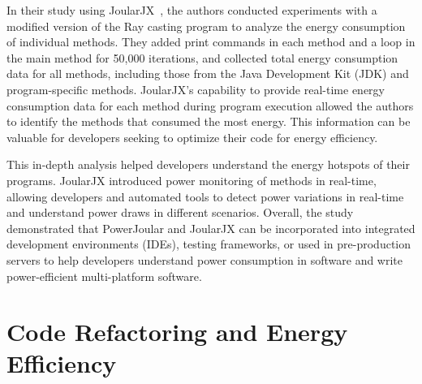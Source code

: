 In their study using JoularJX~\cite{DBLP:conf/intenv/Noureddine22}, the authors conducted experiments with a modified version of the Ray casting program to analyze the energy consumption of individual methods. They added print commands in each method and a loop in the main method for 50,000 iterations, and collected total energy consumption data for all methods, including those from the Java Development Kit (JDK) and program-specific methods. JoularJX's capability to provide real-time energy consumption data for each method during program execution allowed the authors 
to identify the methods that consumed the most energy. This information can be valuable for developers seeking to optimize their code for energy efficiency.\par

This in-depth analysis helped developers understand the energy hotspots of their programs. JoularJX introduced power monitoring of methods in real-time, allowing developers and automated tools to detect power variations in real-time and understand power draws in different scenarios. Overall, the study demonstrated that PowerJoular and JoularJX can be incorporated into integrated development environments (IDEs), testing frameworks, or used in pre-production servers to help developers understand power consumption in software and write power-efficient multi-platform software.\par


\section{Code Refactoring and Energy Efficiency}

\setlength{\parskip}{5pt}

